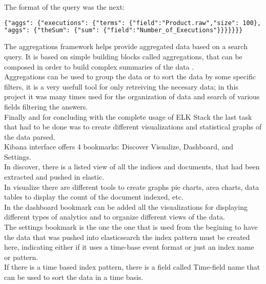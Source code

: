 The format of the query was the next: 
\begin{lstlisting}[language=xml,frame=tb,caption={query example}]
{"aggs": {"executions": {"terms": {"field":"Product.raw","size": 100},
"aggs": {"theSum": {"sum": {"field":"Number_of_Executions"}}}}}}}
\end{lstlisting}
\medskip


The aggregations framework helps provide aggregated data based on a search query. It is based on simple building blocks called aggregations, that can be composed in order to build complex summaries of the data \cite{2}.
\\

Aggregations can be used to group the data or to sort the data by some specific filters, it is a very usefull tool for only retreiving the necesary data; in this project it was many times used for the organization of data and search of various fields filtering the answers.
\\

Finally and for concluding with the complete usage of ELK Stack the last task that had to be done was to create different visualizations and statistical graphs of the data parsed.
\\

Kibana interface offers 4 bookmarks: Discover Visualize, Dashboard, and Settings.
\\

In discover, there is a listed view of all the indices and documents, that had been extracted and pushed in elastic.
\\

In visualize there are different tools to create graphs pie charts, area charts, data tables to display the count of the document indexed, etc.
\\

In the dashboard bookmark can be added all the visualizations for displaying different types of analytics and to organize different views of the data.
\\

The settings bookmark is the one the one that is used from the begining to have the data that was pushed into elasticsearch the index pattern must be created here, indicating either if it uses a time-base event format or just an index name or pattern.
\\

If there is a time based index pattern, there is a field called Time-field name that can be used to sort the data in a time basis.
\\

